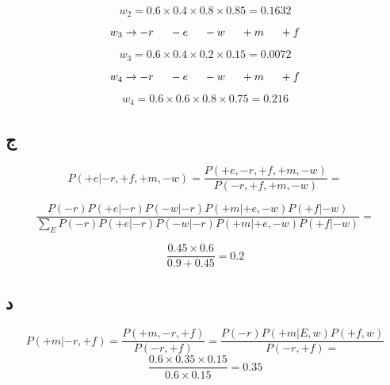 $$
w_2 = 0.6 \times 0.4 \times 0.8 \times 0.85 = 0.1632
$$

$$
w_3 \rightarrow -r \hspace{+0.5cm} -e \hspace{+0.5cm} -w \hspace{+0.5cm} +m \hspace{+0.5cm} +f
$$

$$
w_3 = 0.6 \times 0.4 \times 0.2 \times 0.15 = 0.0072
$$

$$
w_4 \rightarrow -r \hspace{+0.5cm} -e \hspace{+0.5cm} -w \hspace{+0.5cm} +m \hspace{+0.5cm} +f
$$

$$
w_4 = 0.6 \times 0.6 \times 0.8 \times 0.75 = 0.216
$$

\subsection*{ج}

$$P(+e | -r , +f , +m , -w) = \frac{P(+e , -r , +f , +m , -w)}{P(-r , +f , +m , -w)} =$$

$$\frac{P(-r) P(+e | -r) P(-w | -r) P(+m | +e , -w) P(+f | -w)}{\sum_{E}^{}{P(-r) P(+e | -r) P(-w | -r) P(+m | +e , -w) P(+f | -w)}} =$$

$$\frac{0.45 \times 0.6}{0.9 + 0.45} = 0.2$$

\subsection*{د}

$$ 
P(+m | -r , +f) = \frac{P(+m , -r , +f)}{P(-r , +f)} = \frac{P(-r) P(+m | E , w) P(+f , w)}{P(-r , +f) =}
$$
$$\frac{0.6 \times 0.35 \times 0.15}{0.6 \times 0.15} = 0.35$$